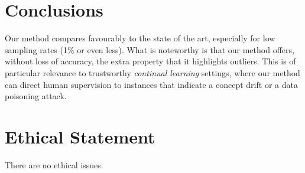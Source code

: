 \documentclass{article}
\begin{document}
\section{Conclusions}

Our method compares favourably to the state of the art, especially for
low sampling rates (1\% or even less). What is noteworthy is that
our method offers, without loss of accuracy, the extra property that
it highlights outliers. This is of particular relevance to
trustworthy \emph{continual learning} settings, where our method
can direct human supervision to instances that indicate a concept
drift or a data poisoning attack.


\appendix

\section*{Ethical Statement}

There are no ethical issues.

\end{document}
